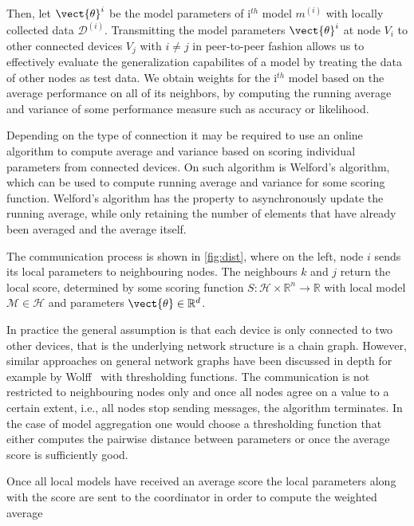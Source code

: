 Then, let $\vect{\theta}^{i}$ be the model parameters of i$^{th}$ model $m^{(i)}$ with locally collected data $\mathcal{D}^{(i)}$.
Transmitting the model parameters $\vect{\theta}^{i}$  at node $V_i$  to other connected devices  $V_j$ with $i \neq j$ in peer-to-peer fashion allows us to effectively evaluate the generalization capabilites of a model by treating the data of other nodes as test data.
We obtain weights for the i$^{th}$ model based on the average performance on all of its neighbors, by computing the running average and variance of some performance measure such as accuracy or likelihood.

Depending on the type of connection it may be required to use an online algorithm to compute average and variance based on scoring individual parameters from connected devices.
On such algorithm is Welford's algorithm, which can be used to compute running average and variance for some scoring function.
Welford's algorithm has the property to asynchronously update the running average, while only retaining the number of elements that have already been averaged and the average itself.

The communication process is shown in \fig \ref{fig:dist}, where on the left, node $i$ sends its local parameters to neighbouring nodes. The neighbours $k$ and $j$ return the local score, determined by some scoring function $S: \mathcal{H} \times \mathbb{R}^n \rightarrow \mathbb{R}$ with local model $\mathcal{M} \in \mathcal{H}$ and parameters $\vect{\theta} \in \mathbb{R}^d$.



In practice the general assumption is that each device is only connected to two other devices, that is the underlying network structure is a chain graph.
However, similar approaches on general network graphs have been discussed in depth for example by Wolff~\cite{wolff2013local} with thresholding functions.
The communication is not restricted to neighbouring nodes only and once all nodes agree on a value to a certain extent, i.e., all nodes stop sending messages, the algorithm terminates.
In the case of model aggregation one would choose a thresholding function that either computes the pairwise distance between parameters or once the average score is sufficiently good.

Once all local models have received an average score the local parameters along with the score are sent to the coordinator in order to compute the weighted average

